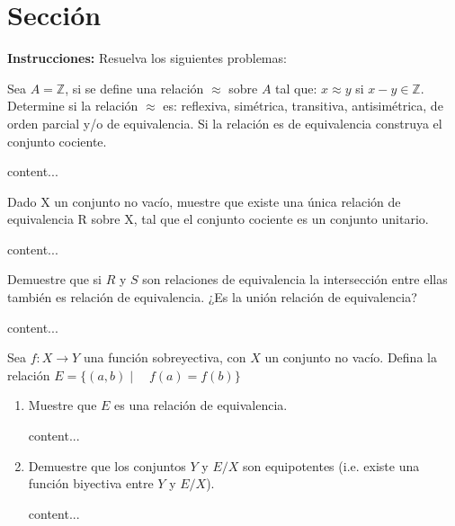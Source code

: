 




\section{Sección}
\textbf{Instrucciones: }  Resuelva los siguientes problemas: 
\begin{problema}
	Sea $A=\mathbb{Z}$, si se define una relación $\approx$ sobre $A$ tal que: $x \approx y$ si $x-y \in \mathbb{Z}$. Determine si la relación $\approx$ es: reflexiva, simétrica, transitiva, antisimétrica, de orden parcial y/o de equivalencia. Si la relación es de equivalencia construya el conjunto cociente.
	\begin{dem}
		content...
	\end{dem}
\end{problema}

\begin{problema}
	Dado X un conjunto no vacío, muestre que existe una única relación de equivalencia $\mathrm{R}$ sobre X, tal que el conjunto cociente es un conjunto unitario.
	\begin{dem}
		content...
	\end{dem}
\end{problema}

\begin{problema}
	 Demuestre que si $R$ y $S$ son relaciones de equivalencia la intersección entre ellas también es relación de equivalencia. ¿Es la unión relación de equivalencia?
	 \begin{dem}
	 	content...
	 \end{dem}
\end{problema}

\begin{problema}
	Sea $f: X \rightarrow Y$ una función sobreyectiva, con $X$ un conjunto no vacío. Defina la relación $E=\{(a, b) \mid \quad f(a)=f(b)\}$
	\begin{enumerate}
		\item Muestre que $E$ es una relación de equivalencia.
		\begin{dem}
			content...
		\end{dem}
		\item Demuestre que los conjuntos $Y$ y $E / X$ son equipotentes (i.e. existe una función biyectiva entre $Y$ y $E / X$).
		\begin{dem}
			content...
		\end{dem}
	\end{enumerate}
	
\end{problema}

